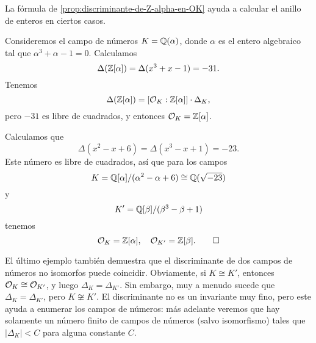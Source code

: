 La fórmula de \ref{prop:discriminante-de-Z-alpha-en-OK} ayuda a calcular
el anillo de enteros en ciertos casos.

\begin{ejemplo}
  Consideremos el campo de números $K = \mathbb{Q} (\alpha)$, donde $\alpha$
  es el entero algebraico tal que $\alpha^3 + \alpha - 1 = 0$. Calculamos
  $$\Delta (\mathbb{Z} [\alpha]) = \Delta (x^3 + x - 1) = -31.$$
  Tenemos
  $$\Delta (\mathbb{Z} [\alpha]) = [\mathcal{O}_K : \mathbb{Z} [\alpha]] \cdot \Delta_K,$$
  pero $-31$ es libre de cuadrados, y entonces $\mathcal{O}_K = \mathbb{Z} [\alpha]$.
\end{ejemplo}

\begin{ejemplo}
  Calculamos que
  $$\Delta (x^2 - x + 6) = \Delta (x^3 - x + 1) = -23.$$
  Este número es libre de cuadrados, así que para los campos
  $$K = \mathbb{Q} [\alpha]/(\alpha^2 - \alpha + 6) \cong \mathbb{Q} (\sqrt{-23})$$
  y
  $$K' = \mathbb{Q} [\beta]/(\beta^3 - \beta + 1)$$
  tenemos
  \[ \mathcal{O}_K = \mathbb{Z} [\alpha], \quad \mathcal{O}_{K'} = \mathbb{Z} [\beta]. \qedhere \]
\end{ejemplo}

\begin{comentario}
  El último ejemplo también demuestra que el discriminante de dos campos
  de números no isomorfos puede coincidir. Obviamente, si $K \cong K'$, entonces
  $\mathcal{O}_K \cong \mathcal{O}_{K'}$, y luego $\Delta_K = \Delta_{K'}$.
  Sin embargo, muy a menudo sucede que $\Delta_K = \Delta_{K'}$, pero
  $K \not\cong K'$. El discriminante no es un invariante muy fino, pero este
  ayuda a enumerar los campos de números: más adelante veremos que hay solamente
  un número finito de campos de números (salvo isomorfismo) tales que
  $|\Delta_K| < C$ para alguna constante $C$.
\end{comentario}

